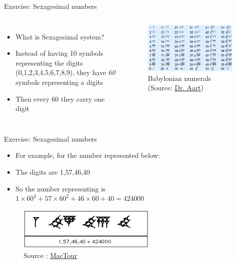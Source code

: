 \documentclass[10pt,xcolor={table,dvipsnames},t]{beamer}
\begin{document}
\begin{frame}{Exercise: Sexagesimal numbers}
  \begin{columns}
    \begin{itemize}
      \item What is Sexagesimal system?
      \item Instead of having 10 symbols representing the digits (0,1,2,3,4,5,6,7,8,9), they have \textit{60} symbols representing a digits
      \item Then every 60 they carry one digit
    \end{itemize}
    \begin{figure}
      \includegraphics[width=\textwidth]{img/babylonian-numerical.png}
      \caption*{Babylonian numerals (Source: \href{https://www.dr-aart.nl/Arithmetic-roman-binary-octal-and-babylonian-numerals.html}{Dr. Aart})}
    \end{figure}
  \end{columns}
\end{frame}

\begin{frame}{Exercise: Sexagesimal numbers}
  \begin{itemize}
    \item For example, for the number represented below:
    \item The digits are 1,57,46,40
    \item So the number representing is\\ $1 \times 60^3 + 57 \times 60^2 + 46\times 60 + 40 = 424000$
  \end{itemize}
  \begin{figure}
    \includegraphics[width=0.6\textwidth]{img/babylonian-numer-example.png}
    \caption*{Source : \href{https://mathshistory.st-andrews.ac.uk/HistTopics/Babylonian_numerals/}{MacTour}}
  \end{figure}
\end{frame}
\end{document}
